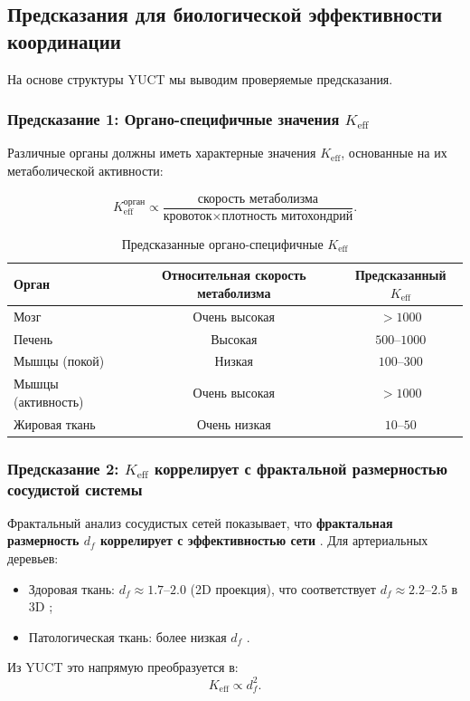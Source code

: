 \documentclass[12pt]{article}
\newcommand{\Keff}{K_{\mathrm{eff}}}
\begin{document}
	\subsection{Предсказания для биологической эффективности координации}
	
	На основе структуры YUCT мы выводим проверяемые предсказания.
	
	\subsubsection{Предсказание 1: Органо-специфичные значения \(\Keff\)}
	
	Различные органы должны иметь характерные значения \(\Keff\), основанные на их метаболической активности:
	
	\begin{equation}
		\Keff^{\text{орган}} \propto \frac{\text{скорость метаболизма}}{\text{кровоток} \times \text{плотность митохондрий}}.
	\end{equation}
	
	\begin{table}[htbp]
		\centering
		\caption{Предсказанные органо-специфичные \(K_{\mathrm{eff}}\)}
		\label{tab:organ-keff}
		\begin{tabular}{lcc}
			\toprule
			\textbf{Орган} & \textbf{Относительная скорость метаболизма} & \textbf{Предсказанный \(K_{\mathrm{eff}}\)} \\
			\midrule
			Мозг      & Очень высокая   & \(>1000\) \\
			Печень    & Высокая        & \(500\)–\(1000\) \\
			Мышцы (покой) & Низкая     & \(100\)–\(300\) \\
			Мышцы (активность) & Очень высокая & \(>1000\) \\
			Жировая ткань & Очень низкая & \(10\)–\(50\) \\
			\bottomrule
		\end{tabular}
	\end{table}
	
	\subsubsection{Предсказание 2: \(\Keff\) коррелирует с фрактальной размерностью сосудистой системы}
	
	Фрактальный анализ сосудистых сетей показывает, что \textbf{фрактальная размерность \(d_f\) коррелирует с эффективностью сети} \cite{Gould1993}. Для артериальных деревьев:
	\begin{itemize}
		\item Здоровая ткань: \(d_f \approx 1.7\)–\(2.0\) (2D проекция), что соответствует \(d_f \approx 2.2\)–\(2.5\) в 3D \cite{Cross1993};
		\item Патологическая ткань: более низкая \(d_f\) \cite{Gould1993}.
	\end{itemize}
	Из YUCT это напрямую преобразуется в:
	\begin{equation}
		\Keff \propto d_f^{2}.
	\end{equation}
	
\end{document}
